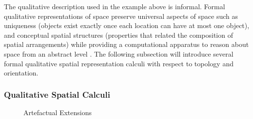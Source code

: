 \documentclass[12pt]{ucthesis}
\begin{document}
The qualitative description used in the example above is informal. Formal qualitative representations of space preserve universal aspects of space such as uniqueness (objects exist exactly once each location can have at most one object), and conceptual spatial structures (properties that related the composition of spatial arrangements) while providing a computational apparatus to reason about space from an abstract level \cite{freksa1991qsr}. The following subsection will introduce several formal qualitative spatial representation calculi with respect to topology and orientation. 


\subsubsection{Qualitative Spatial Calculi}
\begin{figure}[t]
 \centering
 \hspace{7 mm}
  \hspace{7 mm}
 \caption{Artefactual Extensions}
\label{Qualitative Spatial Calculi}
\end{figure}
\end{document}
